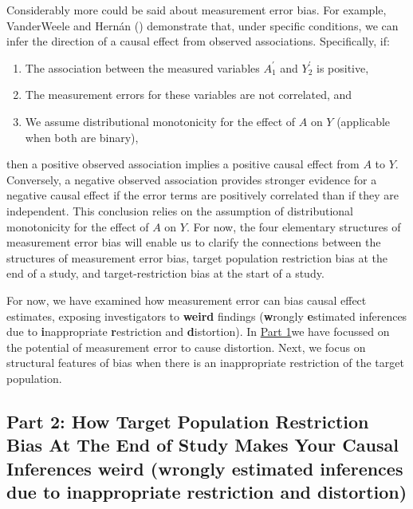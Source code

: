 \documentclass[
  single column]{article}
\providecommand{\tightlist}{%
  \setlength{\itemsep}{0pt}\setlength{\parskip}{0pt}}\usepackage{longtable,booktabs,array}
\begin{document}
Considerably more could be said about measurement error bias. For
example, VanderWeele and Hernán ()
demonstrate that, under specific conditions, we can infer the direction
of a causal effect from observed associations. Specifically, if:

\begin{enumerate}
\def\labelenumi{\arabic{enumi}.}
\tightlist
\item
  The association between the measured variables \(A^{\prime}_{1}\) and
  \(Y^{\prime}_{2}\) is positive,
\item
  The measurement errors for these variables are not correlated, and
\item
  We assume distributional monotonicity for the effect of \(A\) on \(Y\)
  (applicable when both are binary),
\end{enumerate}

then a positive observed association implies a positive causal effect
from \(A\) to \(Y\). Conversely, a negative observed association
provides stronger evidence for a negative causal effect if the error
terms are positively correlated than if they are independent. This
conclusion relies on the assumption of distributional monotonicity for
the effect of \(A\) on \(Y\). For now, the four elementary structures of
measurement error bias will enable us to clarify the connections between
the structures of measurement error bias, target population restriction
bias at the end of a study, and target-restriction bias at the start of
a study.

For now, we have examined how measurement error can bias causal effect
estimates, exposing investigators to \textbf{weird} findings
(\textbf{w}rongly \textbf{e}stimated inferences due to
\textbf{i}nappropriate \textbf{r}estriction and \textbf{d}istortion). In
\hyperref[id-sec-1]{Part 1}we have focussed on the potential of
measurement error to cause distortion. Next, we focus on structural
features of bias when there is an inappropriate restriction of the
target population.

\subsection{\texorpdfstring{Part 2: How Target Population Restriction
Bias At The End of Study Makes Your Causal Inferences weird
(\textbf{w}rongly \textbf{e}stimated inferences due to
\textbf{i}nappropriate \textbf{r}estriction and
\textbf{d}istortion)}{Part 2: How Target Population Restriction Bias At The End of Study Makes Your Causal Inferences weird (wrongly estimated inferences due to inappropriate restriction and distortion)}}\label{id-sec-2}
\end{document}
